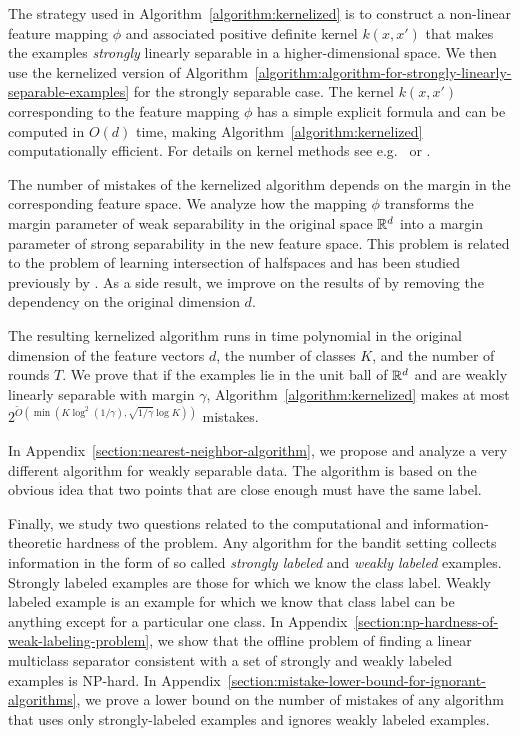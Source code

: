 The strategy used in Algorithm~\ref{algorithm:kernelized} is to construct a
non-linear feature mapping $\phi$ and associated positive definite kernel
$k(x,x')$ that makes the examples \emph{strongly} linearly separable in a
higher-dimensional space. We then use the kernelized version of
Algorithm~\ref{algorithm:algorithm-for-strongly-linearly-separable-examples} for
the strongly separable case. The kernel $k(x,x')$ corresponding to the feature
mapping $\phi$ has a simple explicit formula and can be computed in $O(d)$ time,
making Algorithm~\ref{algorithm:kernelized} computationally efficient. For
details on kernel methods see e.g.~\citet{Scholkopf-Smola-2002} or
\citet{Shawe-Taylor-Cristianini-2004}.

The number of mistakes of the kernelized algorithm depends on the margin in the
corresponding feature space. We analyze how the mapping $\phi$ transforms the
margin parameter of weak separability in the original space $\mathbb{R}^d$ into a margin
parameter of strong separability in the new feature space. This problem is
related to the problem of learning intersection of halfspaces and has been
studied previously by \citet{Klivans-Servedio-2008}. As a side result, we
improve on the results of \citet{Klivans-Servedio-2008} by removing the
dependency on the original dimension $d$.

The resulting kernelized algorithm runs in time polynomial in the
original dimension of the feature vectors $d$, the number of classes $K$, and
the number of rounds $T$. We prove that if the examples lie in the unit ball of
$\mathbb{R}^d$ and are weakly linearly separable with margin $\gamma$,
Algorithm~\ref{algorithm:kernelized} makes at
most $2^{\widetilde{O}(\min(K \log^2 (1/\gamma), \sqrt{1/\gamma}
\log K))}$ mistakes.

In Appendix~\ref{section:nearest-neighbor-algorithm}, we propose and analyze a
very different algorithm for weakly separable data. The algorithm is based on
the obvious idea that two points that are close enough must have the same label.

Finally, we study two questions related to the computational and
information-theoretic hardness of the problem. Any algorithm for the bandit
setting collects information in the form of so called \emph{strongly labeled}
and \emph{weakly labeled} examples. Strongly labeled examples are those for
which we know the class label. Weakly labeled example is an example for which we
know that class label can be anything except for a particular one class. In
Appendix~\ref{section:np-hardness-of-weak-labeling-problem}, we show that the
offline problem of finding a linear multiclass separator consistent with a set
of strongly and weakly labeled examples is NP-hard. In
Appendix~\ref{section:mistake-lower-bound-for-ignorant-algorithms}, we prove a
lower bound on the number of mistakes of any algorithm that uses only
strongly-labeled examples and ignores weakly labeled examples.
